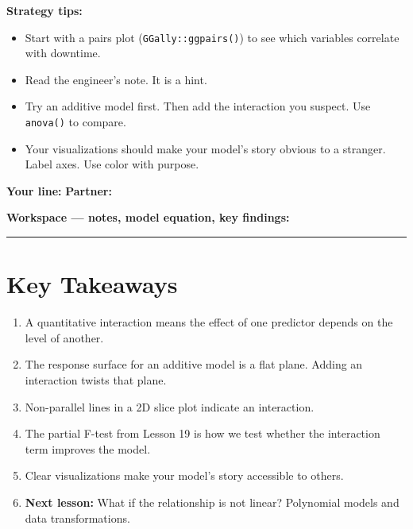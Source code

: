\documentclass[12pt]{article}
\begin{document}
\vspace{0.3cm}

\begin{frameworkbox}
\textbf{Strategy tips:}
\begin{itemize}[nosep]
    \item Start with a pairs plot (\texttt{GGally::ggpairs()}) to see which variables correlate with downtime.
    \item Read the engineer's note. It is a hint.
    \item Try an additive model first. Then add the interaction you suspect. Use \texttt{anova()} to compare.
    \item Your visualizations should make your model's story obvious to a stranger. Label axes. Use color with purpose.
\end{itemize}
\end{frameworkbox}

\vspace{0.5cm}

\noindent
\textbf{Your line:} \underline{\hspace{3cm}} \qquad \textbf{Partner:} \underline{\hspace{3cm}}

\vspace{0.3cm}

\noindent
\textbf{Workspace --- notes, model equation, key findings:}

\vspace{8cm}

\hrule
\vspace{0.3cm}

\section*{Key Takeaways}
\begin{enumerate}
    \item A quantitative interaction means the effect of one predictor depends on the level of another.
    \item The response surface for an additive model is a flat plane. Adding an interaction twists that plane.
    \item Non-parallel lines in a 2D slice plot indicate an interaction.
    \item The partial F-test from Lesson 19 is how we test whether the interaction term improves the model.
    \item Clear visualizations make your model's story accessible to others.
    \item \textbf{Next lesson:} What if the relationship is not linear? Polynomial models and data transformations.
\end{enumerate}
\end{document}
